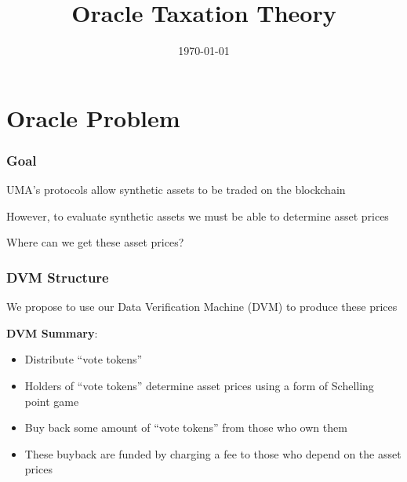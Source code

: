 \documentclass[10pt]{beamer}
\title{Oracle Taxation Theory}
\date[]{\today}
\begin{document}
\begin{frame}
  \titlepage
\end{frame}


\section{Oracle Problem}

  \begin{frame} \frametitle{Goal}

    UMA's protocols allow synthetic assets to be traded on the blockchain

    \vspace{0.20cm}

    However, to evaluate synthetic assets we must be able to determine asset prices

    \vspace{0.20cm}

    Where can we get these asset prices?

  \end{frame}

  \begin{frame} \frametitle{DVM Structure}

    We propose to use our Data Verification Machine (DVM) to produce these prices

    \vspace{0.20cm}

    \textbf{DVM Summary}:
    \begin{itemize}
      \item Distribute ``vote tokens''
      \item Holders of ``vote tokens'' determine asset prices using a form of Schelling point game
      \item Buy back some amount of ``vote tokens'' from those who own them
      \item These buyback are funded by charging a fee to those who depend on the asset prices
    \end{itemize}

  \end{frame}
\end{document}
